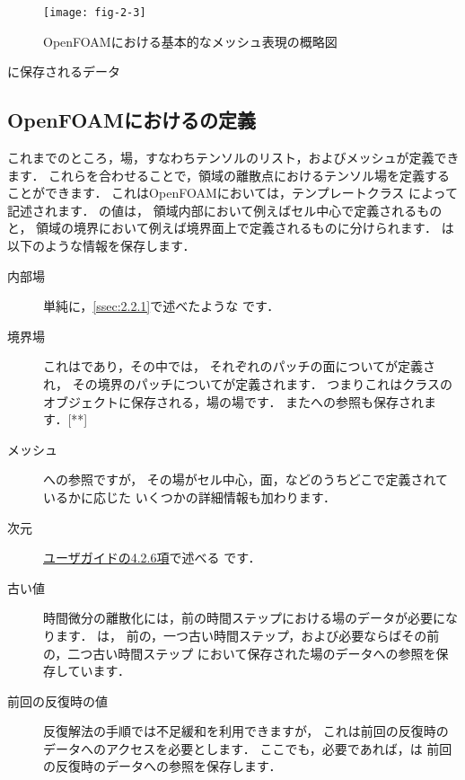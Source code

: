 \begin{figure}[ht]
 \texttt{[image: fig-2-3]}
 \caption{OpenFOAMにおける基本的なメッシュ表現の概略図}
 \label{fig:2.3}
\end{figure}


\begin{table}[ht]
 
 \caption{に保存されるデータ}
 \label{tbl:2.1}
\end{table}


\subsection{OpenFOAMにおけるの定義}
\label{ssec:2.3.2}
これまでのところ，場，すなわちテンソルのリスト，およびメッシュが定義できます．
これらを合わせることで，領域の離散点におけるテンソル場を定義することができます．
これはOpenFOAMにおいては，テンプレートクラス
によって記述されます．
の値は，
領域内部において例えばセル中心で定義されるものと，
領域の境界において例えば境界面上で定義されるものに分けられます．
は以下のような情報を保存します．
\begin{description}
 \item[内部場] 単純に，\autoref{ssec:2.2.1}で述べたような
            です．
 \item[境界場] これはであり，その中では，
            それぞれのパッチの面についてが定義され，
            その境界のパッチについてが定義されます．
            つまりこれはクラスのオブジェクトに保存される，場の場です．
            またへの参照も保存されます．[**]
 \item[メッシュ] への参照ですが，
            その場がセル中心，面，などのうちどこで定義されているかに応じた
            いくつかの詳細情報も加わります．
 \item[次元] \href{../UserGuideJa/UserGuideJa.pdf#subsection.4.2.6}{ユーザガイドの4.2.6項}で述べる
            です．
 \item[古い値] 時間微分の離散化には，前の時間ステップにおける場のデータが必要になります．
            は，
            前の，一つ古い時間ステップ，および必要ならばその前の，二つ古い時間ステップ
            において保存された場のデータへの参照を保存しています．
 \item[前回の反復時の値] 反復解法の手順では不足緩和を利用できますが，
            これは前回の反復時のデータへのアクセスを必要とします．
            ここでも，必要であれば，は
            前回の反復時のデータへの参照を保存します．
\end{description}
